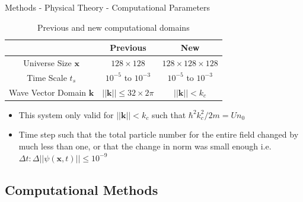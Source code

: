 \documentclass[aspectratio=169]{beamer}
\begin{document}
            \begin{frame}{Methods - Physical Theory - Computational Parameters}
                \begin{table}[h]
                    \centering
                    \begin{tabular}{c|c|c}
                        & Previous & New  \\
                        \hline
                        Universe Size $\mathbf{x}$      & $128 \times 128$ & $128 \times 128 \times 128$ \\
                        \hline
                        Time Scale $t_s$                & $10^{-5}$ to $10^{-3}$ & $10^{-5}$ to $10^{-3}$ \\
                        \hline
                        Wave Vector Domain $\mathbf{k}$ & $||\mathbf{k}|| \leq 32 \times 2 \pi$ & $||\mathbf{k}|| < k_c$ \\
                    \end{tabular}
                    \caption{Previous and new computational domains}
                    \label{tab:Domains}
                \end{table}
                \vspace{-0.2in}
                \begin{itemize}
                    \item This system only valid for $||\mathbf{k}|| < k_c$ such that $\hbar^2 k_c^2 / 2 m = U n_0$
                    \item Time step such that the total particle number for the entire field changed by much less than one, or that the change in norm was small enough i.e. $\Delta t : \Delta ||\psi(\mathbf{x}, t)|| \leq 10^{-9}$
                \end{itemize}
            \end{frame}

    \subsection{Computational Methods}
\end{document}

